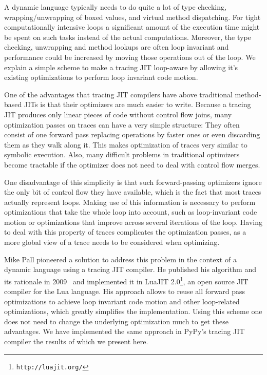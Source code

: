 \documentclass[preprint]{sigplanconf}
\let\oldcite=\cite
\renewcommand\cite[1]{\ifthenelse{\equal{#1}{XXX}}{[citation~needed]}{\oldcite{#1}}}
\begin{document}
A dynamic language typically needs to do quite a lot of type
checking, wrapping/unwrapping of boxed values, and virtual method dispatching. 
For tight computationally intensive loops a
significant amount of the execution time might be spent on such tasks
instead of the actual computations. Moreover, the type checking,
unwrapping and method lookups are often loop invariant and performance could be increased
by moving those operations out of the loop. We explain a simple scheme
to make a tracing JIT loop-aware by allowing it's existing optimizations to
perform loop invariant code motion. 

One of the advantages that tracing JIT compilers have above traditional
method-based
JITs is that their optimizers are much easier to write. Because a tracing JIT
produces only linear pieces of code without control flow joins, many
optimization passes on traces can have a very simple structure: They often
consist of one forward pass replacing operations by faster ones or even
discarding them as they walk along it. This makes
optimization of traces very similar to symbolic execution. Also, many
difficult problems in traditional optimizers become tractable if the optimizer
does not need to deal with control flow merges.

One disadvantage of this simplicity is that such forward-passing
optimizers ignore the only bit of control flow they have available, which is
the fact that most traces actually represent loops. Making use of this
information is necessary to perform optimizations that take the whole loop into
account, such as loop-invariant code
motion or optimizations that improve across several iterations of the loop.
Having to deal with this property of traces complicates the optimization passes,
as a more global view of a trace needs to be considered when optimizing.

Mike Pall pioneered a solution to address this problem in the context of a
dynamic language using a tracing JIT compiler. He published his algorithm and
its rationale in 2009~\cite{pall_luajit_2009} and implemented it in LuaJIT
2.0\footnote{\texttt{http://luajit.org/}}, an open source JIT compiler for the Lua
language. His approach allows to reuse all forward pass
optimizations to achieve loop invariant code motion and other loop-related
optimizations, which greatly simplifies the implementation. Using this scheme
one does not need to change the underlying optimization much to get these
advantages. We have implemented the same approach in PyPy's tracing JIT
compiler the results of which we present here.
\end{document}
